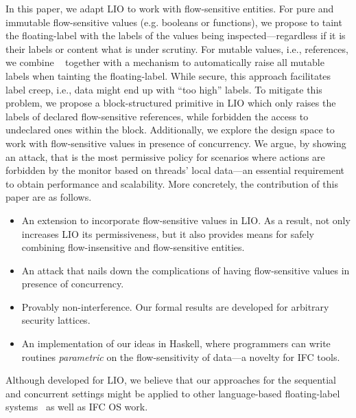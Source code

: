 In this paper, we adapt LIO to work with flow-sensitive entities.  For pure and
immutable flow-sensitive values (e.g. booleans or functions), we propose to
taint the floating-label with the labels of the values being
inspected---regardless if it is their labels or content what is under scrutiny.
For mutable values, i.e., references, we combine
\nsu~\citep{Austin:Flanagan:PLAS10} together with a mechanism to automatically
raise all mutable labels when tainting the floating-label. While secure, this
approach facilitates label creep, i.e., data might end up with ``too high''
labels. To mitigate this problem, we propose a block-structured primitive in LIO
which only raises the labels of declared flow-sensitive references, while
forbidden the access to undeclared ones within the block.
Additionally, we explore the design space to work with flow-sensitive values in presence
of concurrency.
We argue, by showing an attack, that {\nsu} is the most
permissive policy for scenarios where actions are forbidden by the monitor based on threads'
local data---an essential requirement to obtain performance and
scalability. More
concretely, the contribution of this paper are as follows.
\begin{itemize}

\item An extension to incorporate flow-sensitive values in LIO. As a result,
  not only increases LIO its permissiveness, but it also provides means for safely
  combining flow-insensitive and flow-sensitive entities. 

\item An attack that nails down the complications of having flow-sensitive
  values in presence of concurrency.

\item Provably non-interference. Our formal results are developed for arbitrary
  security lattices. 

\item An implementation of our ideas in Haskell, where programmers can write
  routines \emph{parametric} on the flow-sensitivity of data---a novelty for IFC
  tools. 
\end{itemize}

Although developed for LIO, we believe that our approaches for the sequential
and concurrent settings might be applied to other language-based floating-label
systems~\citep[e.g.][]{10.1109/SP.2013.10} as well as IFC OS work.


